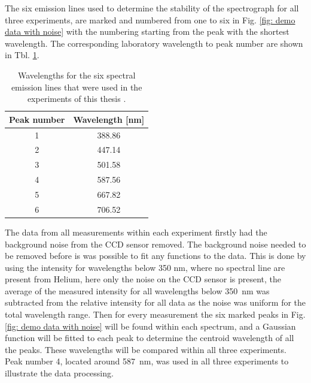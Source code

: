 The six emission lines used to determine the stability of the spectrograph for all three experiments, are marked and numbered from one to six in Fig. \ref{fig: demo data with noise} with the numbering starting from the peak with the shortest wavelength. The corresponding laboratory wavelength to peak number are shown in Tbl. \ref{tbl: Helium peaks}.
\begin{table}
\centering
    \begin{tabular}{cc}
    \hline
    Peak number & Wavelength [nm] \\ \hline
    1           & 388.86           \\
    2           & 447.14         \\
    3           & 501.58           \\
    4           & 587.56         \\
    5           & 667.82           \\
    6           & 706.52           \\ \hline
    \end{tabular}
    \caption{Wavelengths for the six spectral emission lines that were used in the experiments of this thesis \citep{helium-wavelength}.} 
    \label{tbl: Helium peaks}
\end{table}

The data from all measurements within each experiment firstly had the background noise from the CCD sensor removed. The background noise needed to be removed before is was possible to fit any functions to the data. This is done by using the intensity for wavelengths below 350 nm, where no spectral line are present from Helium, here only the noise on the CCD sensor is present, the average of the measured intensity for all wavelengths below \SI{350}{nm} was subtracted from the relative intensity for all data as the noise was uniform for the total wavelength range.
Then for every measurement the six marked peaks in Fig. \ref{fig: demo data with noise} will be found within each spectrum, and a Gaussian function will be fitted to each peak to determine the centroid wavelength of all the peaks. These wavelengths will be compared within all three experiments. Peak number 4, located around \SI{587}{nm}, was used in all three experiments to illustrate the data processing.

